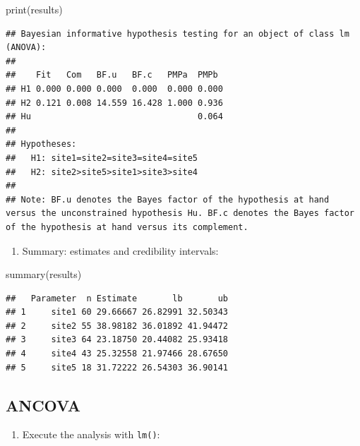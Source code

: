 \documentclass[
]{book}
\newenvironment{Shaded}{\begin{snugshade}}{\end{snugshade}}
\newcommand{\FunctionTok}[1]{\textcolor[rgb]{0.00,0.00,0.00}{#1}}
\newcommand{\NormalTok}[1]{#1}
\providecommand{\tightlist}{%
  \setlength{\itemsep}{0pt}\setlength{\parskip}{0pt}}
\begin{document}
\begin{Shaded}
\begin{Highlighting}[]
\FunctionTok{print}\NormalTok{(results)}
\end{Highlighting}
\end{Shaded}

\begin{verbatim}
## Bayesian informative hypothesis testing for an object of class lm (ANOVA):
## 
##    Fit   Com   BF.u   BF.c   PMPa  PMPb 
## H1 0.000 0.000 0.000  0.000  0.000 0.000
## H2 0.121 0.008 14.559 16.428 1.000 0.936
## Hu                                 0.064
## 
## Hypotheses:
##   H1: site1=site2=site3=site4=site5
##   H2: site2>site5>site1>site3>site4
## 
## Note: BF.u denotes the Bayes factor of the hypothesis at hand versus the unconstrained hypothesis Hu. BF.c denotes the Bayes factor of the hypothesis at hand versus its complement.
\end{verbatim}

\begin{enumerate}
\def\labelenumi{\arabic{enumi})}
\setcounter{enumi}{4}
\tightlist
\item
  Summary: estimates and credibility intervals:
\end{enumerate}

\begin{Shaded}
\begin{Highlighting}[]
\FunctionTok{summary}\NormalTok{(results)}
\end{Highlighting}
\end{Shaded}

\begin{verbatim}
##   Parameter  n Estimate       lb       ub
## 1     site1 60 29.66667 26.82991 32.50343
## 2     site2 55 38.98182 36.01892 41.94472
## 3     site3 64 23.18750 20.44082 25.93418
## 4     site4 43 25.32558 21.97466 28.67650
## 5     site5 18 31.72222 26.54303 36.90141
\end{verbatim}

\hypertarget{ancova}{%
\subsection{ANCOVA}\label{ancova}}

\begin{enumerate}
\def\labelenumi{\arabic{enumi})}
\tightlist
\item
  Execute the analysis with \texttt{lm()}:
\end{enumerate}
\end{document}
